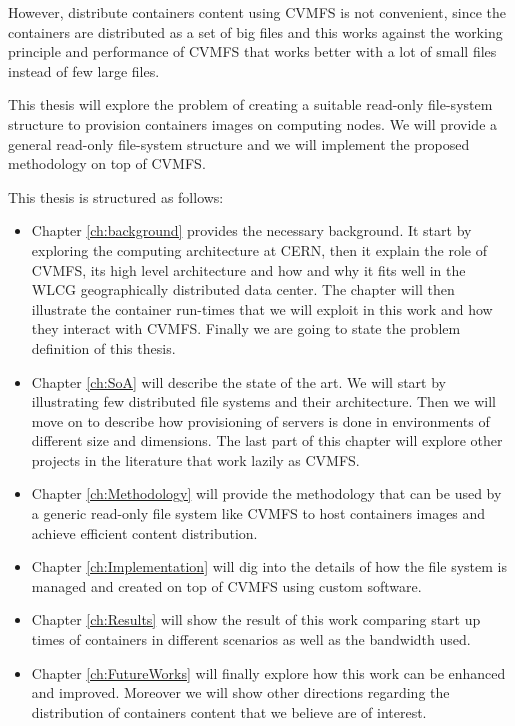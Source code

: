 However, distribute containers content using CVMFS is not convenient, since the
containers are distributed as a set of big files and this works against the
working principle and performance of CVMFS that works better with a lot of
small files instead of few large files.

This thesis will explore the problem of creating a suitable read-only
file-system structure to provision containers images on computing nodes. We
will provide a general read-only file-system structure and we will implement the
proposed methodology on top of CVMFS.

This thesis is structured as follows:
\begin{itemize} 
        \item Chapter \ref{ch:background} provides the necessary background. It
                start by exploring the computing architecture at CERN, then it
                explain the role of CVMFS, its high level architecture and how
                and why it fits well in the WLCG geographically distributed
                data center. The chapter will then illustrate the container
                run-times that we will exploit in this work and how they
                interact with CVMFS. Finally we are going to state the problem
                definition of this thesis.  
        \item Chapter \ref{ch:SoA} will describe the state of the art. We will
                start by illustrating few distributed file systems and their
                architecture. Then we will move on to describe how provisioning
                of servers is done in environments of different size and
                dimensions.  The last part of this chapter will explore other
                projects in the literature that work lazily as CVMFS.

        \item Chapter \ref{ch:Methodology} will provide the methodology that
                can be used by a generic read-only file system like CVMFS to
                host containers images and achieve efficient content
                distribution.

        \item Chapter \ref{ch:Implementation} will dig into the details of how
                the file system is managed and created on top of CVMFS using
                custom software.

        \item Chapter \ref{ch:Results} will show the result of this work
                comparing start up times of containers in different scenarios
                as well as the bandwidth used.

        \item Chapter \ref{ch:FutureWorks} will finally explore how this work
                can be enhanced and improved. Moreover we will show other
                directions regarding the distribution of containers content
                that we believe are of interest. 
\end{itemize}

